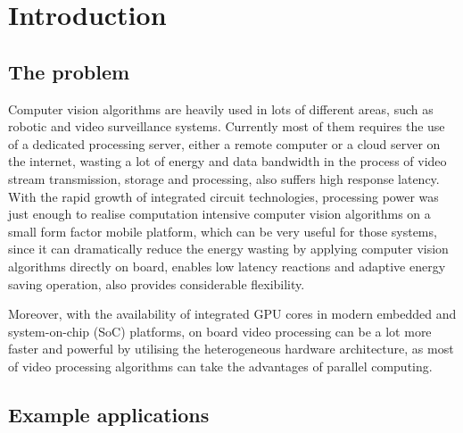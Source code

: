 \chapter{Introduction} \label{Chapter:Introduction}

\iffalse
1-1.5 pages
\fi

\section{The problem}

\iffalse
Use heterogeneous hardware.
\fi

Computer vision algorithms are heavily used in lots of different areas, such as robotic and video surveillance systems. Currently most of them requires the use of a dedicated processing server, either a remote computer or a cloud server on the internet, wasting a lot of energy and data bandwidth in the process of video stream transmission, storage and processing, also suffers high response latency. With the rapid growth of integrated circuit technologies, processing power was just enough to realise computation intensive computer vision algorithms on a small form factor mobile platform, which can be very useful for those systems, since it can dramatically reduce the energy wasting by applying computer vision algorithms directly on board, enables low latency reactions and adaptive energy saving operation, also provides considerable flexibility.

Moreover, with the availability of integrated GPU cores in modern embedded and system-on-chip (SoC) platforms, on board video processing can be a lot more faster and powerful by utilising the heterogeneous hardware architecture, as most of video processing algorithms can take the advantages of parallel computing.


\section{Example applications} %

\iffalse
Example applications, can be multiple.
e.g. Video conference.
\fi

